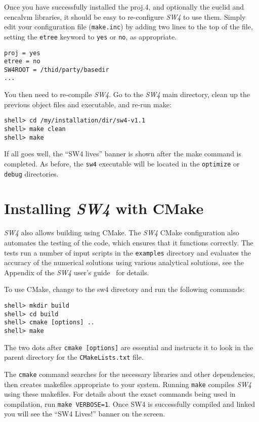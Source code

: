 \documentclass[11pt]{article}
\begin{document}
Once you have successfully installed the proj.4, and optionally the euclid and cencalvm libraries,
it should be easy to re-configure \emph{SW4} to use them. Simply edit your configuration file
(\verb+make.inc+) by adding two lines to the top of the file, setting the {\tt etree} keyword to
{\tt yes} or {\tt no}, as appropriate.
\begin{verbatim}
proj = yes
etree = no
SW4ROOT = /thid/party/basedir
...
\end{verbatim}
You then need to re-compile \emph{SW4}. Go to the \emph{SW4} main directory, clean up the previous
object files and executable, and re-run make:
\begin{verbatim}
shell> cd /my/installation/dir/sw4-v1.1
shell> make clean
shell> make
\end{verbatim}
If all goes well, the ``SW4 lives'' banner is shown after the make command is
completed. As before, the \verb+sw4+ executable will be located in the \verb+optimize+ or
\verb+debug+ directories.

\section{Installing \emph{SW4} with CMake}\label{cha:installing-cmake-sw4}
\emph{SW4} also allows building using CMake.  The \emph{SW4} CMake configuration also automates the
testing of the code, which ensures that it functions correctly. The tests run a number of input
scripts in the \verb+examples+ directory and evaluates the accuracy of the numerical solutions using
various analytical solutions, see the Appendix of the \emph{SW4} user's guide~\cite{SW4-11} for
details.

To use CMake, change to the sw4 directory and run the following commands:
\begin{verbatim}
shell> mkdir build
shell> cd build
shell> cmake [options] ..
shell> make
\end{verbatim}
The two dots after {\tt cmake [options]} are essential and instructs it to look in the parent
directory for the {\tt CMakeLists.txt} file.
 
The \verb+cmake+ command searches for the necessary libraries and other dependencies, then creates
makefiles appropriate to your system.  Running \verb+make+ compiles \emph{SW4} using these
makefiles.  For details about the exact commands being used in compilation, run \texttt{make
  VERBOSE=1}.  Once SW4 is successfully compiled and linked you will see the ``SW4 Lives!'' banner
on the screen.
\end{document}
